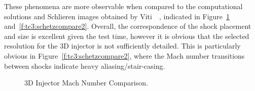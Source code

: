 These phenomena are more observable when compared to the computational solutions and Schlieren images obtained by Viti~\cite{schetz2009}~\cite{viti2004}, indicated in Figure~\ref{f:tc3:schetzcompare1} and~\ref{f:tc3:schetzcompare2}. Overall, the correspondence of the shock placement and size is excellent given the test time, however it is obvious that the selected resolution for the 3D injector is not sufficiently detailed. This is particularly obvious in Figure~\ref{f:tc3:schetzcompare2}, where the Mach number transitions between shocks indicate heavy aliasing/stair-casing. 

\begin{figure} [htbp]
	\centering
	\qquad	
	\caption{3D Injector Mach Number Comparison.}%
	\label{f:tc3:schetzcompare1}%
\end{figure}


